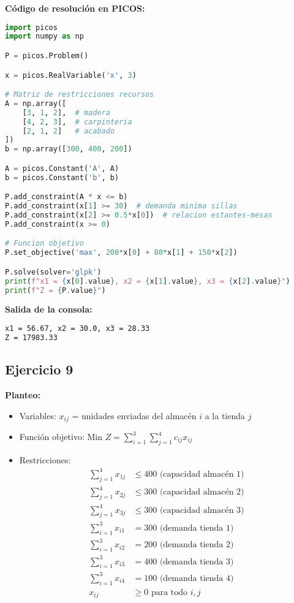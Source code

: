 \documentclass[12pt]{article}
\begin{document}
\textbf{Código de resolución en PICOS:}
\begin{lstlisting}[language=Python]
import picos
import numpy as np

P = picos.Problem()

x = picos.RealVariable('x', 3)

# Matriz de restricciones recursos
A = np.array([
    [3, 1, 2],  # madera
    [4, 2, 3],  # carpinteria
    [2, 1, 2]   # acabado
])
b = np.array([300, 400, 200])

A = picos.Constant('A', A)
b = picos.Constant('b', b)

P.add_constraint(A * x <= b)
P.add_constraint(x[1] >= 30)  # demanda minima sillas
P.add_constraint(x[2] >= 0.5*x[0])  # relacion estantes-mesas
P.add_constraint(x >= 0)

# Funcion objetivo
P.set_objective('max', 200*x[0] + 80*x[1] + 150*x[2])

P.solve(solver='glpk')
print(f"x1 = {x[0].value}, x2 = {x[1].value}, x3 = {x[2].value}")
print(f"Z = {P.value}")
\end{lstlisting}

\textbf{Salida de la consola:}
\begin{lstlisting}[language=bash,backgroundcolor=\color{black},basicstyle=\color{white}\ttfamily,numbers=none]
x1 = 56.67, x2 = 30.0, x3 = 28.33
Z = 17983.33
\end{lstlisting}

\subsection*{Ejercicio 9}

\textbf{Planteo:}
\begin{itemize}
\item Variables: $x_{ij}$ = unidades enviadas del almacén $i$ a la tienda $j$
\item Función objetivo: Min $Z = \sum_{i=1}^3 \sum_{j=1}^4 c_{ij}x_{ij}$
\item Restricciones:
  \begin{align*}
  \sum_{j=1}^4 x_{1j} &\leq 400 \text{ (capacidad almacén 1)} \\
  \sum_{j=1}^4 x_{2j} &\leq 300 \text{ (capacidad almacén 2)} \\
  \sum_{j=1}^4 x_{3j} &\leq 300 \text{ (capacidad almacén 3)} \\
  \sum_{i=1}^3 x_{i1} &= 300 \text{ (demanda tienda 1)} \\
  \sum_{i=1}^3 x_{i2} &= 200 \text{ (demanda tienda 2)} \\
  \sum_{i=1}^3 x_{i3} &= 400 \text{ (demanda tienda 3)} \\
  \sum_{i=1}^3 x_{i4} &= 100 \text{ (demanda tienda 4)} \\
  x_{ij} &\geq 0 \text{ para todo } i,j
  \end{align*}
\end{itemize}
\end{document}
